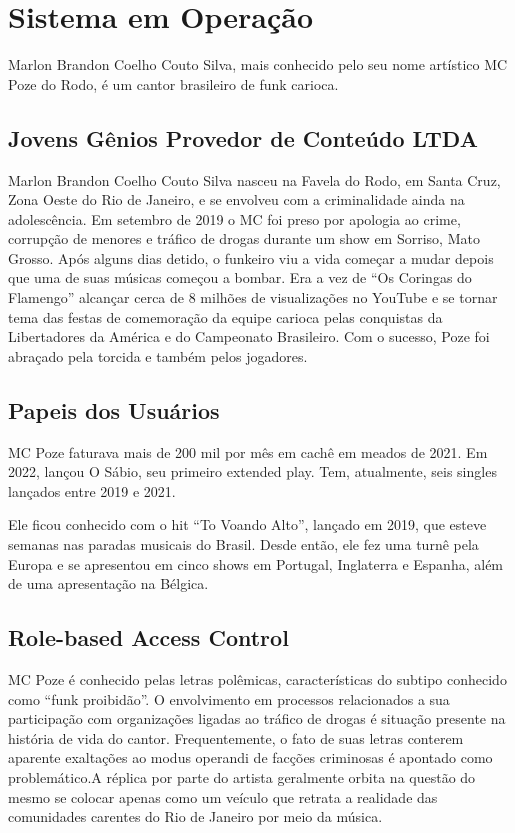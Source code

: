 \chapter{Sistema em Operação}
\label{chap5}

Marlon Brandon Coelho Couto Silva, mais conhecido pelo seu nome artístico MC Poze do Rodo, é um cantor brasileiro de funk carioca.

\section{Jovens Gênios Provedor de Conteúdo LTDA}

Marlon Brandon Coelho Couto Silva nasceu na Favela do Rodo, em Santa Cruz, Zona Oeste do Rio de Janeiro, e se envolveu com a criminalidade ainda na adolescência. Em setembro de 2019 o MC foi preso por apologia ao crime, corrupção de menores e tráfico de drogas durante um show em Sorriso, Mato Grosso. Após alguns dias detido, o funkeiro viu a vida começar a mudar depois que uma de suas músicas começou a bombar. Era a vez de ``Os Coringas do Flamengo'' alcançar cerca de 8 milhões de visualizações no YouTube e se tornar tema das festas de comemoração da equipe carioca pelas conquistas da Libertadores da América e do Campeonato Brasileiro. Com o sucesso, Poze foi abraçado pela torcida e também pelos jogadores.

\section{Papeis dos Usuários}

MC Poze faturava mais de 200 mil por mês em cachê em meados de 2021. Em 2022, lançou O Sábio, seu primeiro extended play. Tem, atualmente, seis singles lançados entre 2019 e 2021.

Ele ficou conhecido com o hit ``To Voando Alto'', lançado em 2019, que esteve semanas nas paradas musicais do Brasil. Desde então, ele fez uma turnê pela Europa e se apresentou em cinco shows em Portugal, Inglaterra e Espanha, além de uma apresentação na Bélgica.

\section{Role-based Access Control}

MC Poze é conhecido pelas letras polêmicas, características do subtipo conhecido como ``funk proibidão''. O envolvimento em processos relacionados a sua participação com organizações ligadas ao tráfico de drogas é situação presente na história de vida do cantor. Frequentemente, o fato de suas letras conterem aparente exaltações ao modus operandi de facções criminosas é apontado como problemático.A réplica por parte do artista geralmente orbita na questão do mesmo se colocar apenas como um veículo que retrata a realidade das comunidades carentes do Rio de Janeiro por meio da música.
